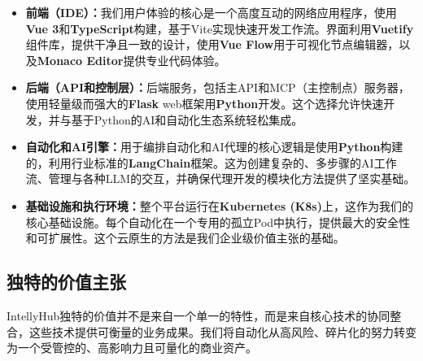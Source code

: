 \documentclass[11pt, a4paper, oneside]{article}
\begin{document}
\begin{itemize}
\item \textbf{前端（IDE）：}我们用户体验的核心是一个高度互动的网络应用程序，使用\textbf{Vue 3}和\textbf{TypeScript}构建，基于Vite实现快速开发工作流。界面利用\textbf{Vuetify}组件库，提供干净且一致的设计，使用\textbf{Vue Flow}用于可视化节点编辑器，以及\textbf{Monaco Editor}提供专业代码体验。

\item \textbf{后端（API和控制层）：}后端服务，包括主API和MCP（主控制点）服务器，使用轻量级而强大的\textbf{Flask} web框架用\textbf{Python}开发。这个选择允许快速开发，并与基于Python的AI和自动化生态系统轻松集成。

\item \textbf{自动化和AI引擎：}用于编排自动化和AI代理的核心逻辑是使用\textbf{Python}构建的，利用行业标准的\textbf{LangChain}框架。这为创建复杂的、多步骤的AI工作流、管理与各种LLM的交互，并确保代理开发的模块化方法提供了坚实基础。

\item \textbf{基础设施和执行环境：}整个平台运行在\textbf{Kubernetes (K8s)}上，这作为我们的核心基础设施。每个自动化在一个专用的孤立Pod中执行，提供最大的安全性和可扩展性。这个云原生的方法是我们企业级价值主张的基础。
\end{itemize}

\subsection{独特的价值主张}
IntellyHub独特的价值并不是来自一个单一的特性，而是来自核心技术的协同整合，这些技术提供可衡量的业务成果。我们将自动化从高风险、碎片化的努力转变为一个受管控的、高影响力且可量化的商业资产。
\end{document}
